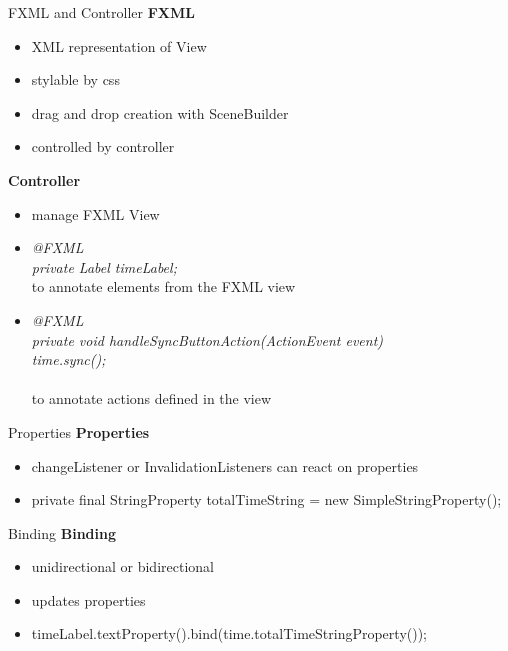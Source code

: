 \begin{frame}{FXML and Controller}
\textbf{FXML}\\
\begin{itemize}
\item XML representation of View 
\item stylable by css
\item drag and drop creation with SceneBuilder
\item controlled by controller
\end{itemize}
\textbf{Controller}\\
\begin{itemize}
\item manage FXML View
\item    \textit{ @FXML\\
    private Label timeLabel;}\\
    to annotate elements from the FXML view
\item \textit{ @FXML\\
    private void handleSyncButtonAction(ActionEvent event) {\\
        time.sync(); }\\
    }\\
    to annotate actions defined in the view
    
\end{itemize}
\end{frame}\begin{frame}{Properties}
\textbf{Properties}\\
\begin{itemize}
\item changeListener or InvalidationListeners can react on properties
\item  private final StringProperty totalTimeString = new SimpleStringProperty();
\end{itemize}
\end{frame}
\begin{frame}{Binding}
\textbf{Binding}\\
\begin{itemize}
\item unidirectional or bidirectional
\item updates properties
\item timeLabel.textProperty().bind(time.totalTimeStringProperty());
\end{itemize}
\end{frame}